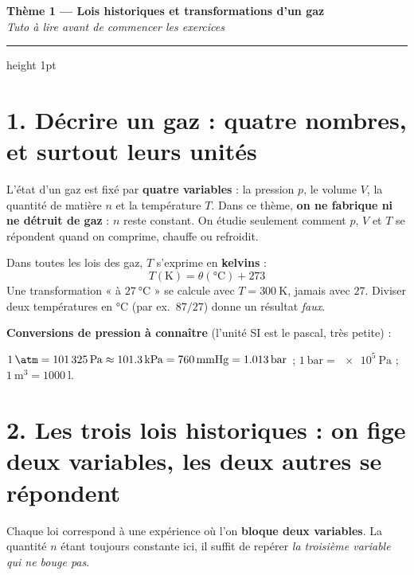 \documentclass[11pt,a4paper]{article}
\begin{document}
\begin{center}
{\Large\bfseries\color{primarydark} Thème 1 — Lois historiques et transformations d'un gaz}\\[2pt]
{\color{primary}\itshape Tuto à lire avant de commencer les exercices}
\end{center}
\vspace{-2pt}
\textcolor{primary}{\hrule height 1pt}
\vspace{6pt}

\section*{1. Décrire un gaz : quatre nombres, et surtout leurs unités}

L'état d'un gaz est fixé par \textbf{quatre variables} : la pression \textcolor{pcol}{$p$}, le volume
\textcolor{vcol}{$V$}, la quantité de matière \textcolor{ncol}{$n$} et la température
\textcolor{tcol}{$T$}. Dans ce thème, \textbf{on ne fabrique ni ne détruit de gaz} : $n$ reste constant.
On étudie seulement comment $p$, $V$ et $T$ se répondent quand on comprime, chauffe ou refroidit.

\begin{piege}
Dans toutes les lois des gaz, $T$ s'exprime en \textbf{kelvins} :
\[ \boxed{\,T(\si{\kelvin}) = \theta(\si{\degreeCelsius}) + 273\,} \]
Une transformation « à $\qty{27}{\degreeCelsius}$ » se calcule avec $T=\qty{300}{\kelvin}$, jamais avec $27$.
Diviser deux températures en \si{\degreeCelsius} (par ex.\ $87/27$) donne un résultat \emph{faux}.
\end{piege}

\textbf{Conversions de pression à connaître} (l'unité SI est le pascal, très petite) :
\begin{center}\small
$\qty{1}{\atm}=\qty{101325}{\pascal}\approx\qty{101.3}{\kilo\pascal}=\qty{760}{\mmHg}=\qty{1.013}{\bar}$
\qquad ; \qquad $\qty{1}{\bar}=\qty{e5}{\pascal}$ \qquad ; \qquad $\qty{1}{\meter\cubed}=\qty{1000}{\litre}$.
\end{center}

\section*{2. Les trois lois historiques : on fige deux variables, les deux autres se répondent}

Chaque loi correspond à une expérience où l'on \textbf{bloque deux variables}. La quantité $n$ étant
toujours constante ici, il suffit de repérer \emph{la troisième variable qui ne bouge pas}.
\end{document}
